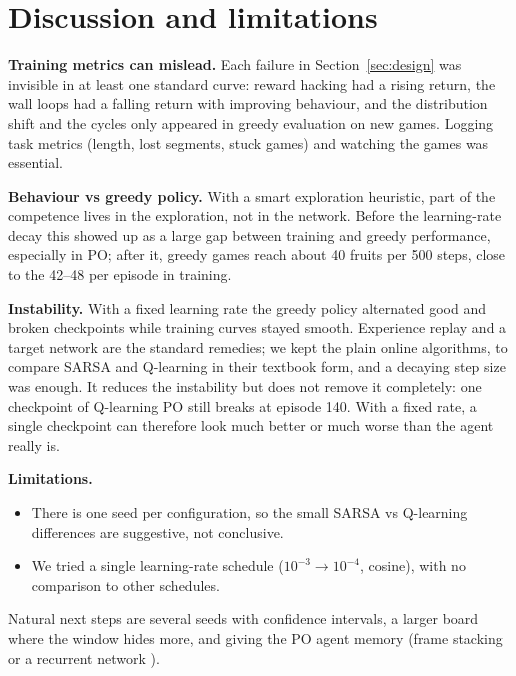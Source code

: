 \documentclass{article}
\begin{document}
\section{Discussion and limitations}
\label{sec:discussion}

\textbf{Training metrics can mislead.} Each failure in Section~\ref{sec:design} was invisible in at least one standard curve: reward hacking had a rising return, the wall loops had a falling return with improving behaviour, and the distribution shift and the cycles only appeared in greedy evaluation on new games. Logging task metrics (length, lost segments, stuck games) and watching the games was essential.

\textbf{Behaviour vs greedy policy.} With a smart exploration heuristic, part of the competence lives in the exploration, not in the network. Before the learning-rate decay this showed up as a large gap between training and greedy performance, especially in PO; after it, greedy games reach about 40 fruits per 500 steps, close to the 42--48 per episode in training.

\textbf{Instability.} With a fixed learning rate the greedy policy alternated good and broken checkpoints while training curves stayed smooth. Experience replay and a target network \cite{mnih2015} are the standard remedies; we kept the plain online algorithms, to compare SARSA and Q-learning in their textbook form, and a decaying step size was enough. It reduces the instability but does not remove it completely: one checkpoint of Q-learning PO still breaks at episode 140. With a fixed rate, a single checkpoint can therefore look much better or much worse than the agent really is.

\textbf{Limitations.}
\begin{itemize}
\item There is one seed per configuration, so the small SARSA vs Q-learning differences are suggestive, not conclusive.
\item We tried a single learning-rate schedule ($10^{-3}\to10^{-4}$, cosine), with no comparison to other schedules.
\end{itemize}
Natural next steps are several seeds with confidence intervals, a larger board where the window hides more, and giving the PO agent memory (frame stacking or a recurrent network \cite{hausknecht2015}).
\end{document}

